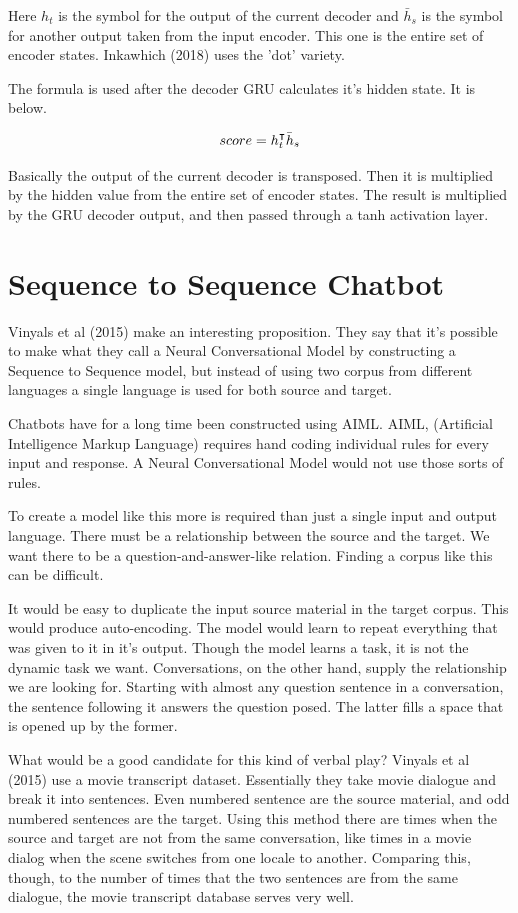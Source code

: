 Here $h_t$ is the symbol for the output of the current decoder and $\bar{h}_s $ is the symbol for another output taken from the input encoder. This one is the entire set of encoder states. Inkawhich (2018)\cite{2018Inkawhich} uses the 'dot' variety.

The formula is used after the decoder GRU calculates it's hidden state. It is below.

$$ 
\boldmath
score = h_t^\intercal \bar{h}_s 
\unboldmath
$$ 

Basically the output of the current decoder is transposed. Then it is multiplied by the hidden value from the entire set of encoder states. The result is multiplied by the GRU decoder output, and then passed through a tanh activation layer.

\section{Sequence to Sequence Chatbot}

Vinyals et al (2015)\cite{DBLP:journals/corr/VinyalsL15} make an interesting proposition. They say that it's possible to make what they call a Neural Conversational Model by constructing a Sequence to Sequence model, but instead of using two corpus from different languages a single language is used for both source and target.

Chatbots have for a long time been constructed using AIML. AIML, (Artificial Intelligence Markup Language) requires hand coding individual rules for every input and response. A Neural Conversational Model would not use those sorts of rules.

To create a model like this more is required than just a single input and output language. There must be a relationship between the source and the target. We want there to be a question-and-answer-like relation. Finding a corpus like this can be difficult.

It would be easy to duplicate the input source material in the target corpus. This would produce auto-encoding. The model would learn to repeat everything that was given to it in it's output. Though the model learns a task, it is not the dynamic task we want. Conversations, on the other hand, supply the relationship we are looking for. Starting with almost any question sentence in a conversation, the sentence following it answers the question posed. The latter fills a space that is opened up by the former. 

What would be a good candidate for this kind of verbal play? Vinyals et al (2015)\cite{DBLP:journals/corr/VinyalsL15} use a movie transcript dataset. Essentially they take movie dialogue and break it into sentences. Even numbered sentence are the source material, and odd numbered sentences are the target. Using this method there are times when the source and target are not from the same conversation, like times in a movie dialog when the scene switches from one locale to another. Comparing this, though, to the number of times that the two sentences are from the same dialogue, the movie transcript database serves very well.

